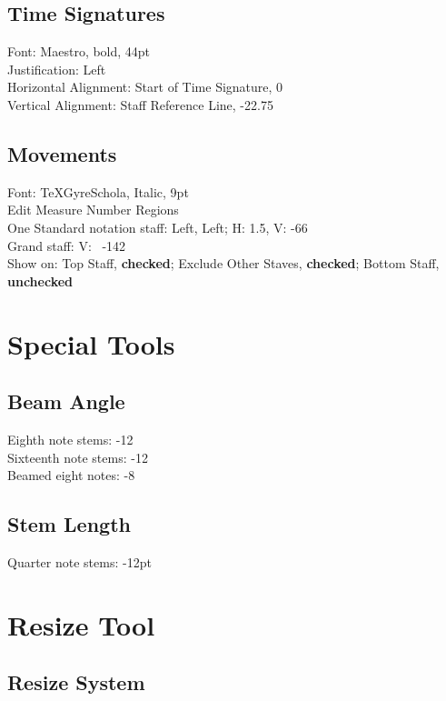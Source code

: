 \documentclass[]{memoir}
\begin{document}
\section{Time Signatures}
\label{sec:time-signatures}

Font: Maestro, bold, 44pt\\
Justification: Left\\
Horizontal Alignment: Start of Time Signature, 0\\
Vertical Alignment: Staff Reference Line, -22.75

\section{Movements}
\label{sec:movements}

Font: TeXGyreSchola, Italic, 9pt\\
Edit Measure Number Regions\\
One Standard notation staff: Left, Left; H: 1.5, V: -66\\
Grand staff: V: ~-142\\
Show on: Top Staff, \textbf{checked}; Exclude Other Staves, \textbf{checked}; Bottom Staff, \textbf{unchecked}

\chapter{Special Tools}
\label{sec:special-tools}

\section{Beam Angle}
\label{sec:beam-angle}

Eighth note stems: -12\\
Sixteenth note stems: -12\\
Beamed eight notes: -8

\section{Stem Length}
\label{sec:stem-length}

Quarter note stems: -12pt

\chapter{Resize Tool}
\label{sec:resize-tool}

\section{Resize System}
\label{sec:resize-system}
\end{document}
